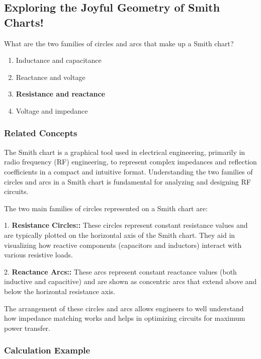 \subsection{Exploring the Joyful Geometry of Smith Charts!}

\begin{tcolorbox}[colback=gray!10, colframe=black, title=E9G04] What are the two families of circles and arcs that make up a Smith chart?  
\begin{enumerate}[label=\Alph*.]
    \item Inductance and capacitance
    \item Reactance and voltage
    \item \textbf{Resistance and reactance}
    \item Voltage and impedance
\end{enumerate} \end{tcolorbox}

\subsubsection{Related Concepts}

The Smith chart is a graphical tool used in electrical engineering, primarily in radio frequency (RF) engineering, to represent complex impedances and reflection coefficients in a compact and intuitive format. Understanding the two families of circles and arcs in a Smith chart is fundamental for analyzing and designing RF circuits. 

The two main families of circles represented on a Smith chart are:

1. \textbf{Resistance Circles::} These circles represent constant resistance values and are typically plotted on the horizontal axis of the Smith chart. They aid in visualizing how reactive components (capacitors and inductors) interact with various resistive loads.

2. \textbf{Reactance Arcs::} These arcs represent constant reactance values (both inductive and capacitive) and are shown as concentric arcs that extend above and below the horizontal resistance axis. 

The arrangement of these circles and arcs allows engineers to well understand how impedance matching works and helps in optimizing circuits for maximum power transfer.

\subsubsection{Calculation Example}

